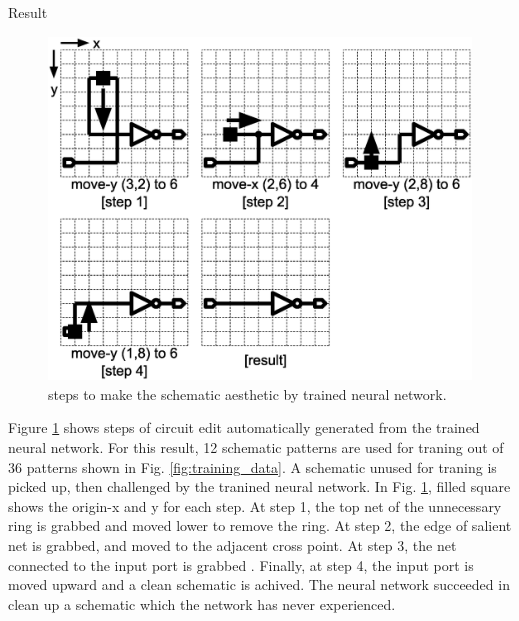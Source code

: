 \documentclass[twocolumn]{article}
\makeatletter
\def\section{\@startsection {section}{1}{\z@}{20pt plus 2pt minus 2pt}
{8pt plus 2pt minus 2pt}{\centering\normalsize\sc
\edef\@svsec{\thesection.\ }}}
\def\thesection{\Roman{section}}
\makeatother
\begin{document}
\section{Result}

\begin{figure}[!tp]
 \begin{center}
  \begin{minipage}{\hsize}
   \includegraphics[width=\hsize]{fig/edit_steps_03.eps}
   \caption{steps to make the schematic aesthetic by trained neural network.}
   \label{fig:edit_steps}
  \end{minipage}
 \end{center}
\end{figure}

Figure \ref{fig:edit_steps} shows steps of circuit edit
automatically generated from the trained neural network.
For this result, 12 schematic patterns are used for traning
out of 36 patterns shown in Fig. \ref{fig:training_data}.
A schematic unused for traning is picked up,
then challenged by the tranined neural network.
In Fig. \ref{fig:edit_steps}, filled square shows the origin-x and y
for each step.
At step 1, the top net of the unnecessary ring is grabbed and moved lower
to remove the ring.
At step 2, the edge of salient net is grabbed,
and moved to the adjacent cross point.
At step 3, the net connected to the input port is grabbed .
Finally, at step 4, the input port is moved upward
and a clean schematic is achived.
The neural network succeeded in clean up a schematic
which the network has never experienced.
\end{document}

